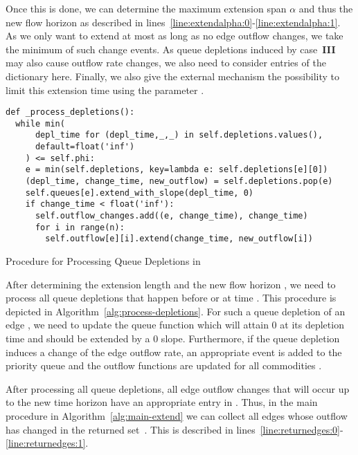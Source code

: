 Once this is done, we can determine the maximum extension span $\alpha$ and thus the new flow horizon  as described in lines~\ref{line:extendalpha:0}-\ref{line:extendalpha:1}.
As we only want to extend at most as long as no edge outflow changes, we take the minimum of such change events.
As queue depletions induced by case~\textbf{III} may also cause outflow rate changes, we also need to consider entries of the dictionary  here.
Finally, we also give the external mechanism the possibility to limit this extension time using the parameter .

\begin{algorithm}
    \begin{verbatim}
def _process_depletions():
  while min(
      depl_time for (depl_time,_,_) in self.depletions.values(),
      default=float('inf')
    ) <= self.phi:
    e = min(self.depletions, key=lambda e: self.depletions[e][0])
    (depl_time, change_time, new_outflow) = self.depletions.pop(e)
    self.queues[e].extend_with_slope(depl_time, 0)
    if change_time < float('inf'):
      self.outflow_changes.add((e, change_time), change_time)
      for i in range(n):
        self.outflow[e][i].extend(change_time, new_outflow[i])
\end{verbatim}
\caption{Procedure for Processing Queue Depletions in }
\label{alg:process-depletions}
\end{algorithm}

After determining the extension length and the new flow horizon , we need to process all queue depletions that happen before or at time .
This procedure is depicted in Algorithm~\ref{alg:process-depletions}.
For such a queue depletion of an edge , we need to update the queue function  which will attain $0$ at its depletion time and should be extended by a $0$ slope.
Furthermore, if the queue depletion induces a change of the edge outflow rate, an appropriate event is added to the priority queue  and the outflow functions  are updated for all commodities .

After processing all queue depletions, all edge outflow changes that will occur up to the new time horizon  have an appropriate entry in .
Thus, in the main procedure in Algorithm~\ref{alg:main-extend} we can collect all edges whose outflow has changed in the returned set~.
This is described in lines~\ref{line:returnedges:0}-\ref{line:returnedges:1}.

